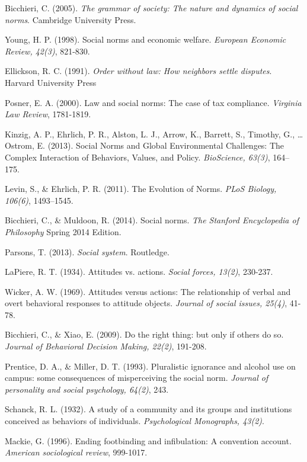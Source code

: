 \documentclass[rutwik_proposal.tex]{subfiles}
\begin{document}
\begin{thebibliography}{100}
Bicchieri, C. 
(2005). 
\emph{The grammar of society: The nature and dynamics of social norms}. 
Cambridge University Press.

Young, H. P. 
(1998). 
Social norms and economic welfare. 
\emph{European Economic Review, 42(3)}, 
821-830.

Ellickson, R. C.
(1991).
\emph{Order without law: How neighbors settle disputes}.
Harvard University Press

Posner, E. A. 
(2000). 
Law and social norms: The case of tax compliance. 
\emph{Virginia Law Review}, 
1781-1819.

Kinzig, A. P., Ehrlich, P. R., Alston, L. J., Arrow, K., Barrett, S., Timothy, G., … Ostrom, E. 
(2013). 
Social Norms and Global Environmental Challenges: The Complex Interaction of Behaviors, Values, and Policy. 
\emph{BioScience, 63(3)}, 
164–175.

Levin, S., \& Ehrlich, P. R. 
(2011). 
The Evolution of Norms. 
\emph{PLoS Biology, 106(6)}, 
1493–1545.

Bicchieri, C., \& Muldoon, R.
(2014).
Social norms.
\emph{The Stanford Encyclopedia of Philosophy}
Spring 2014 Edition.

Parsons, T. 
(2013). 
\emph{Social system}. 
Routledge.

LaPiere, R. T. 
(1934). 
Attitudes vs. actions. 
\emph{Social forces, 13(2)}, 
230-237.

Wicker, A. W. 
(1969). 
Attitudes versus actions: The relationship of verbal and overt behavioral responses to attitude objects. 
\emph{Journal of social issues, 25(4)}, 
41-78.

Bicchieri, C., \& Xiao, E. 
(2009). 
Do the right thing: but only if others do so. 
\emph{Journal of Behavioral Decision Making, 22(2)}, 
191-208.

Prentice, D. A., \& Miller, D. T. 
(1993). 
Pluralistic ignorance and alcohol use on campus: some consequences of misperceiving the social norm. 
\emph{Journal of personality and social psychology, 64(2)}, 
243.

Schanck, R. L. 
(1932). 
A study of a community and its groups and institutions conceived as behaviors of individuals. 
\emph{Psychological Monographs, 43(2)}.

Mackie, G. 
(1996). 
Ending footbinding and infibulation: A convention account. 
\emph{American sociological review}, 
999-1017.


\end{thebibliography}
\end{document}
